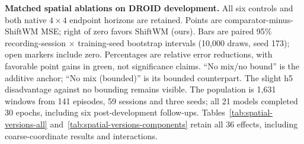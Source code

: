 \textbf{Matched spatial ablations on DROID development.}
All six controls and both native $4\times4$ endpoint horizons are retained.
Points are comparator-minus-ShiftWM MSE; right of zero favors ShiftWM (ours).
Bars are paired 95\% recording-session $\times$ training-seed bootstrap intervals
(10,000 draws, seed 173); open markers include zero. Percentages are relative
error reductions, with favorable point gains in green, not significance claims.
``No mix/no bound'' is the additive anchor; ``No mix (bounded)'' is its bounded
counterpart. The slight h5 disadvantage against no bounding remains visible.
The population is 1,631 windows from 141 episodes, 59 sessions and three seeds;
all 21 models completed 30 epochs, including six post-development follow-ups.
Tables~\ref{tab:spatial-versions-all} and~\ref{tab:spatial-versions-components}
retain all 36 effects, including coarse-coordinate results and interactions.
